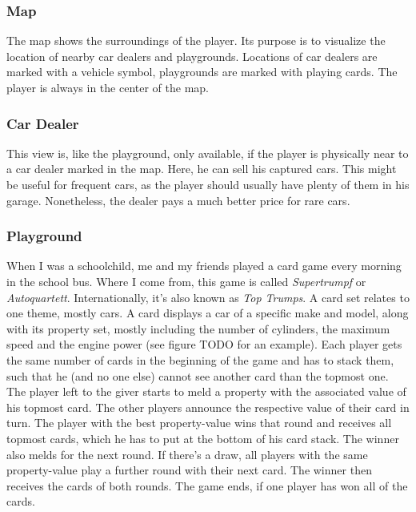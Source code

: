 \subsubsection{Map}
The map shows the surroundings of the player. Its purpose is to visualize the location of nearby car dealers and playgrounds. Locations of car dealers are marked with a vehicle symbol, playgrounds are marked with playing cards. The player is always in the center of the map.

\subsubsection{Car Dealer}
This view is, like the playground, only available, if the player is physically near to a car dealer marked in the map. Here, he can sell his captured cars. This might be useful for frequent cars, as the player should usually have plenty of them in his garage. Nonetheless, the dealer pays a much better price for rare cars.

\subsubsection{Playground}
When I was a schoolchild, me and my friends played a card game every morning in the school bus. Where I come from, this game is called \emph{Supertrumpf} or \emph{Autoquartett}. Internationally, it's also known as \emph{Top Trumps}. A card set relates to one theme, mostly cars. A card displays a car of a specific make and model, along with its property set, mostly including the number of cylinders, the maximum speed and the engine power (see figure TODO for an example). Each player gets the same number of cards in the beginning of the game and has to stack them, such that he (and no one else) cannot see another card than the topmost one. The player left to the giver starts to meld a property with the associated value of his topmost card. The other players announce the respective value of their card in turn. The player with the best property-value wins that round and receives all topmost cards, which he has to put at the bottom of his card stack. The winner also melds for the next round. If there's a draw, all players with the same property-value play a further round with their next card. The winner then receives the cards of both rounds. The game ends, if one player has won all of the cards.

